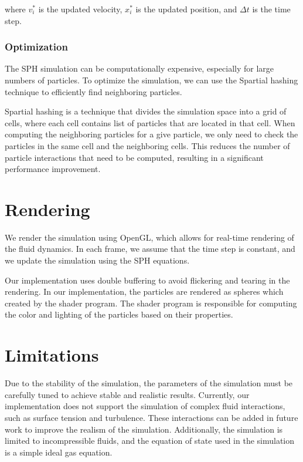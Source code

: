 \documentclass[a4paper]{article}
\begin{document}
where $v_i^*$ is the updated velocity, $x_i^*$ is the updated position, and $\Delta t$ is the time step.

\subsubsection{Optimization}

The SPH simulation can be computationally expensive, especially for large numbers of particles.
To optimize the simulation, we can use the Spartial hashing technique to efficiently find neighboring particles.

Spartial hashing is a technique that divides the simulation space into a grid of cells, where each cell contains list of particles that are located in that cell.
When computing the neighboring particles for a give particle, we only need to check the particles in the same cell and the neighboring cells.
This reduces the number of particle interactions that need to be computed, resulting in a significant performance improvement.

\section{Rendering}

We render the simulation using OpenGL, which allows for real-time rendering of the fluid dynamics.
In each frame, we assume that the time step is constant, and we update the simulation using the SPH equations.

\medskip

Our implementation uses double buffering to avoid flickering and tearing in the rendering.
In our implementation, the particles are rendered as spheres which created by the shader program.
The shader program is responsible for computing the color and lighting of the particles based on their properties.

\section{Limitations}

Due to the stability of the simulation, the parameters of the simulation must be carefully tuned to achieve stable and realistic results.
Currently, our implementation does not support the simulation of complex fluid interactions, such as surface tension and turbulence.
These interactions can be added in future work to improve the realism of the simulation.
Additionally, the simulation is limited to incompressible fluids, and the equation of state used in the simulation is a simple ideal gas equation.
\end{document}
